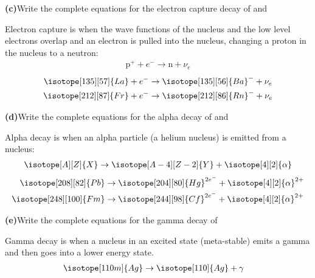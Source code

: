 \documentclass[11pt]{article}
\renewcommand{\part}[1] {\vspace{.10in} {\bf (#1)}}
\begin{document}
\part{c}{Write the complete equations for the electron capture decay of  and }

Electron capture is when the wave functions of the nucleus and the low level electrons overlap and an electron is pulled into the nucleus, changing a proton in the nucleus to a neutron:
\begin{align*}
    \text{p}^{+} + e^{-} \to \text{n} + \nu_e
\end{align*}
\begin{align}
    \isotope[135][57]{La} +e^{-} &\to \isotope[135][56]{Ba}^{-} + \nu_e \\
    \isotope[212][87]{Fr} +e^{-} &\to \isotope[212][86]{Rn}^{-} + \nu_e
\end{align}


\part{d}{Write the complete equations for the alpha decay of  and }

Alpha decay is when an alpha particle (a helium nucleus) is emitted from a nucleus:
\begin{align*}
    \isotope[A][Z]{X} \to \isotope[A-4][Z-2]{Y} + \isotope[4][2]{\mathnormal{\alpha}}
\end{align*}
\begin{align}
    \isotope[208][82]{Pb} &\to \isotope[204][80]{Hg}^{2e^{-}} + \isotope[4][2]{\mathnormal{\alpha}}^{2+} \\ 
    \isotope[248][100]{Fm} &\to \isotope[244][98]{Cf}^{2e^{-}} + \isotope[4][2]{\mathnormal{\alpha}}^{2+} 
\end{align}


\part{e}{Write the complete equations for the gamma decay of }

Gamma decay is when a nucleus in an excited state (meta-stable) emits a gamma and then goes into a lower energy state.
\begin{align}
    \isotope[110m]{Ag} &\to \isotope[110]{Ag} + \gamma
\end{align}
\end{document}
